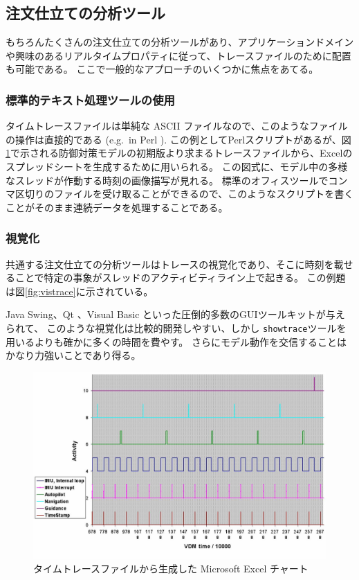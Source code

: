 \documentclass[\pformat,12pt]{jreport}
\begin{document}
\subsection{注文仕立ての分析ツール}

もちろんたくさんの注文仕立ての分析ツールがあり、アプリケーションドメインや興味のあるリアルタイムプロパティに従って、トレースファイルのために配置も可能である。
ここで一般的なアプローチのいくつかに焦点をあてる。

\subsubsection{標準的テキスト処理ツールの使用}

タイムトレースファイルは単純な ASCII ファイルなので、このようなファイルの操作は直接的である (e.g.\ in Perl \cite{Wall&92}). 
この例としてPerlスクリプトがあるが、図\ref{fig:chartExcel}で示される防御対策モデルの初期版より求まるトレースファイルから、Excelのスプレッドシートを生成するために用いられる。
この図式に、モデル中の多様なスレッドが作動する時刻の画像描写が見れる。
標準のオフィスツールでコンマ区切りのファイルを受け取ることができるので、このようなスクリプトを書くことがそのまま連続データを処理することである。

\subsubsection{視覚化}

共通する注文仕立ての分析ツールはトレースの視覚化であり、そこに時刻を載せることで特定の事象がスレッドのアクティビティライン上で起きる。
この例題は図\ref{fig:vistrace}に示されている。

 Java Swing\cite{JavaSwing}、Qt \cite{Qt}、Visual Basic \cite{VisualBasic}といった圧倒的多数のGUIツールキットが与えられて、 このような視覚化は比較的開発しやすい、しかし \texttt{showtrace}ツールを用いるよりも確かに多くの時間を費やす。
さらにモデル動作を交信することはかなり力強いことであり得る。

\begin{figure}
\begin{center}
\includegraphics[width=\textwidth]{analysismissile}
\end{center}
\caption{タイムトレースファイルから生成した Microsoft Excel チャート\label{fig:chartExcel}}
\end{figure}
\end{document}
